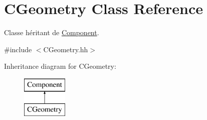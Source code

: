 \hypertarget{class_c_geometry}{}\section{C\+Geometry Class Reference}
\label{class_c_geometry}


Classe héritant de \hyperlink{class_component}{Component}.  




{\ttfamily \#include $<$C\+Geometry.\+hh$>$}

Inheritance diagram for C\+Geometry\+:\begin{figure}[H]
\begin{center}
\leavevmode
\includegraphics[height=2.000000cm]{class_c_geometry}
\end{center}
\end{figure}
